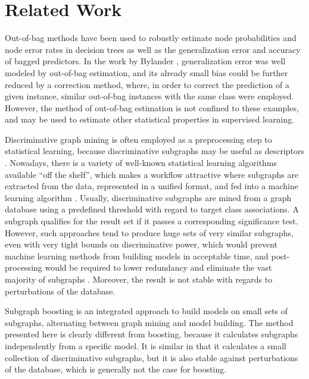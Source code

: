 \documentclass{sig-alternate}
\begin{document}
\section{Related Work}
\label{s:relatedWork}

Out-of-bag methods have been used to robustly estimate node probabilities and
node error rates in decision trees \cite{breiman96oob} as well as the
generalization error and accuracy of bagged predictors. In the work by Bylander
\cite{bylander02estimating}, generalization error was well modeled by
out-of-bag estimation, and its already small bias could be further reduced by a
correction method, where, in order to correct the prediction of a given
instance, similar out-of-bag instances with the same class were
employed. However, the method of out-of-bag estimation is not confined to these
examples, and may be used to estimate other statistical properties in
supervised learning.

Discriminative graph mining is often employed as a preprocessing step to
statistical learning, because discriminative subgraphs may be useful as descriptors
\cite{bringmann10lego}. Nowadays, there is a variety of well-known statistical
learning algorithms available ``off the shelf'', which makes a workflow
attractive where subgraphs are extracted from the data, represented in a
unified format, and fed into a machine learning algorithm \cite{hkr03molfea}.
Usually, discriminative subgraphs are mined from a graph database using a
predefined threshold with regard to target class associations. A subgraph
qualifies for the result set if it passes a corresponding significance test.
However, such approaches tend to produce huge sets of very similar subgraphs,
even with very tight bounds on discriminative power, which would prevent
machine learning methods from building models in acceptable time, and post-processing would be required to lower redundancy and eliminate the vast
majority of subgraphs \cite{Hasan_origami:mining,Jun04Spin}.  Moreover, the
result is not stable with regards to perturbations of the database.

Subgraph boosting \cite{saigo09gboost} is an integrated approach to build models on
small sets of subgraphs, alternating between graph mining and model building. The method presented here is clearly
different from boosting, because it calculates subgraphs independently from a specific model.  It is similar in that it calculates a small
collection of discriminative subgraphs, but it is also stable against
perturbations of the database, which is generally not the case for boosting.
\end{document}
